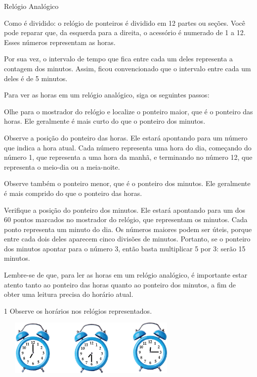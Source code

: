 \begin{escolha}
{Relógio Analógico

Como é dividido: o relógio de ponteiros é dividido em 12 partes ou
seções. Você pode reparar que, da esquerda para a direita, o acessório é
numerado de 1 a 12. Esses números representam as horas.

Por sua vez, o intervalo de tempo que fica entre cada um deles
representa a contagem dos minutos. Assim, ficou convencionado que o
intervalo entre cada um deles é de 5 minutos. 


Para ver as horas em um relógio analógico, siga os seguintes passos:

Olhe para o mostrador do relógio e localize o ponteiro maior, que é o ponteiro das horas. Ele geralmente é mais curto do que o ponteiro dos minutos.

Observe a posição do ponteiro das horas. Ele estará apontando para um número que indica a hora atual. Cada número representa uma hora do dia, começando do número 1, que representa a uma hora da manhã, e terminando no número 12, que representa o meio-dia ou a meia-noite.

Observe também o ponteiro menor, que é o ponteiro dos minutos. Ele geralmente é mais comprido do que o ponteiro das horas.

Verifique a posição do ponteiro dos minutos. Ele estará apontando para um dos 60 pontos marcados no mostrador do relógio, que representam os minutos. Cada ponto representa um minuto do dia. Os números maiores podem ser úteis, porque entre cada dois deles aparecem cinco divisões de minutos. Portanto, se o ponteiro dos minutos apontar para o número 3, então basta multiplicar 5 por 3: serão 15 minutos.

Lembre-se de que, para ler as horas em um relógio analógico, é importante estar atento tanto ao ponteiro das horas quanto ao ponteiro dos minutos, a fim de obter uma leitura precisa do horário atual.}


\num{1} Observe os horários nos relógios representados.


\includegraphics[width=3.66698in,height=1.05843in]{media/image51.png}


\end{escolha}
